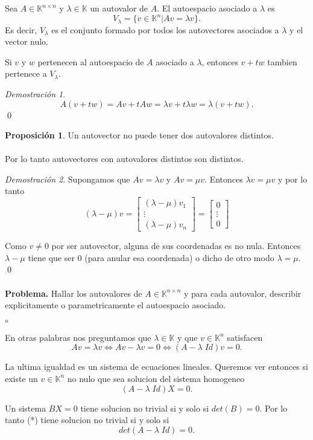 \documentclass{article}
\theoremstyle{definition}
\theoremstyle{definition}
\newtheorem{prop}[teo]{Proposición}
\theoremstyle{remark}
\newtheorem*{demo}{Demostración}
\begin{document}
\begin{defi}
  Sea $A \in \mathbb{K}^{n \times n}$ y $\lambda \in \mathbb{K}$ un autovalor de $A$. El autoespacio asociado a $\lambda$ es \[
  V_{\lambda}=\{v \in \mathbb{K}^n | Av=\lambda v\}.
  \]
  Es decir, $V_{\lambda}$ es el conjunto formado por todos los autovectores asociados a $\lambda$ y el vector nulo.
\end{defi}
\begin{teo}
  Si $v$ y $w$ pertenecen al autoespacio de $A$ asociado a $\lambda$, entonces $v+tw$ tambien pertenece a $V_\lambda$.
\end{teo}
\begin{demo}
  \[
A(v+tw)=Av+tAw=\lambda v + t\lambda w = \lambda(v+tw).
  \]
  \qed
\end{demo}
\begin{prop}
  Un autovector no puede tener dos autovalores distintos. \\\\ Por lo tanto autovectores con autovalores distintos son distintos.
\end{prop}
\begin{demo}
  Supongamos que $Av= \lambda v$ y $Av=\mu v$. Entonces $\lambda v = \mu v$ y por lo tanto \[
    (\lambda - \mu ) v = \begin{bmatrix}(\lambda - \mu ) v_1 \\ \vdots \\ (\lambda - \mu) v_n \end{bmatrix} = \begin{bmatrix} 0 \\ \vdots \\ 0 \end{bmatrix}
  \]
\end{demo}
Como $v \neq 0$ por ser autovector, alguna de sus coordenadas es no nula. Entonces $\lambda - \mu$ tiene que ser $0$ (para anular esa coordenada) o dicho de otro modo $\lambda = \mu$.
\\ \qed
\\\\
\textbf{Problema.} Hallar los autovalores de $A \in \mathbb{K}^{n \times n}$ y para cada autovalor, describir explicitamente o parametricamente el autoespacio asociado.
\begin{list}{$\circ$}{}  
\item En otras palabras nos preguntamos que $\lambda \in \mathbb{K}$ y que $v \in \mathbb{K}^n$ satisfacen \[
Av=\lambda v \Longleftrightarrow Av-\lambda v = 0 \Longleftrightarrow (A-\lambda \; Id) v = 0.
  \]
\item La ultima igualdad es un sistema de ecuaciones lineales. Queremos ver entonces si existe un $v \in \mathbb{K}^n$ no nulo que sea solucion del sistema homogeneo \begin{equation}\tag{*} 
    (A- \lambda \; Id)X=0.
  \end{equation}
\item Un sistema $BX=0$ tiene solucion no trivial si y solo si $det(B)=0$. Por lo tanto (*) tiene solucion no trivial si y solo si \[
det(A-\lambda \; Id)=0.
  \]
\end{list}
\end{document}
